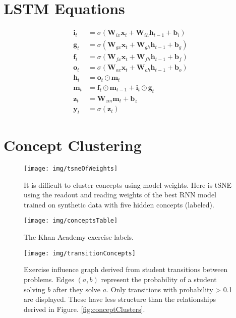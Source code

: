 \documentclass{article} \usepackage{nips,times}
\newcommand{\mb}{\mathbf}
\begin{document}
\section{LSTM Equations}
\label{app LSTM}
\begin{align}
    \mb i_t &= \sigma(\mb W_{ix} \mb x_t + \mb W_{ih} \mb h_{t-1} + \mb b_i)  \\
    \mb g_t &= \sigma(\mb W_{gx} \mb x_t + \mb W_{gh} \mb h_{t-1} + \mb b_g) \\
    \mb f_t &= \sigma(\mb W_{fx} \mb x_t + \mb W_{fh} \mb h_{t-1} + \mb b_f)\\
    \mb o_t &= \sigma(\mb W_{ox} \mb x_t + \mb W_{oh} \mb h_{t-1} + \mb b_o) \\
    \mb h_t &= \mb o_t \odot \mb m_t \\
    \mb m_t &= \mb f_t \odot \mb m_{t-1} + \mb i_t \odot \mb g_t \\
    \mb z_t &= \mb W_{zm} \mb m_t + \mb b_z \\
    \mb y_t &= \sigma(\mb z_t)
\end{align}

\section{Concept Clustering}


\begin{figure}[h]
\centering
\texttt{[image: img/tsneOfWeights]}
\caption{It is difficult to cluster concepts using model weights. Here is tSNE using the readout and reading weights of the best RNN model trained on synthetic data with five hidden concepts (labeled).
\label{fig:tsneWeights}
}
\end{figure}

\begin{figure}[h]
\centering
\texttt{[image: img/conceptsTable]}
\caption{The Khan Academy exercise labels.
\label{fig:conceptsTable2}
}
\end{figure}

\begin{figure}[h]
\centering
\texttt{[image: img/transitionConcepts]}
\caption{Exercise influence graph derived from student transitions between problems. Edges $(a, b)$ represent the probability of a student solving $b$ after they solve $a$. Only transitions with probability > 0.1 are displayed. These have less structure than the relationships derived in Figure.
\ref{fig:conceptClusters}.
\label{fig:transitionConcepts}
}
\end{figure}
\end{document}
